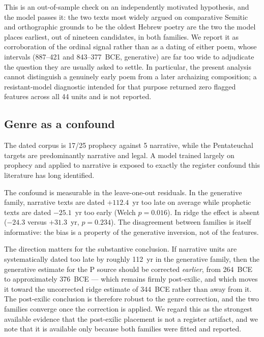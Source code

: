 \documentclass[10pt,letterpaper]{article}
\begin{document}
This is an out-of-sample check on an independently motivated hypothesis,
and the model passes it: the two texts most widely argued on comparative
Semitic and orthographic grounds to be the oldest Hebrew poetry are the two
the model places earliest, out of nineteen candidates, in both families.
We report it as corroboration of the ordinal signal rather than as a dating
of either poem, whose intervals (887--421 and 843--377~BCE, generative)
are far too wide to adjudicate the question they are usually asked to
settle.  In particular, the present analysis cannot distinguish a genuinely
early poem from a later archaizing composition; a resistant-model diagnostic
intended for that purpose returned zero flagged features across all 44
units and is not reported.

\subsection*{Genre as a confound}

The dated corpus is 17/25 prophecy against 5 narrative, while the
Pentateuchal targets are predominantly narrative and legal.  A model
trained largely on prophecy and applied to narrative is exposed to exactly
the register confound this literature has long identified.

The confound is measurable in the leave-one-out residuals.  In the
generative family, narrative texts are dated $+112.4$~yr too late on
average while prophetic texts are dated $-25.1$~yr too early (Welch
$p = 0.016$).  In ridge the effect is absent ($-24.3$ versus $+31.3$~yr,
$p = 0.234$).  The disagreement between families is itself informative:
the bias is a property of the generative inversion, not of the features.

The direction matters for the substantive conclusion.  If narrative units
are systematically dated too late by roughly 112~yr in the generative
family, then the generative estimate for the P source should be corrected
\emph{earlier}, from 264~BCE to approximately 376~BCE --- which remains
firmly post-exilic, and which moves it toward the uncorrected ridge
estimate of 344~BCE rather than away from it.  The post-exilic conclusion
is therefore robust to the genre correction, and the two families converge
once the correction is applied.  We regard this as the strongest available
evidence that the post-exilic placement is not a register artifact, and we
note that it is available only because both families were fitted and
reported.
\end{document}
